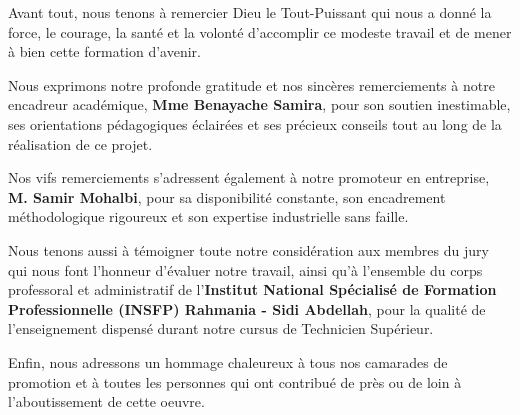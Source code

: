 \documentclass{bts-report}
\begin{document}
\maketitlepage

\frontmatter

\begin{remerciements}
Avant tout, nous tenons \`a remercier Dieu le Tout-Puissant qui nous a donn\'e la force, le courage, la sant\'e et la volont\'e d'accomplir ce modeste travail et de mener \`a bien cette formation d'avenir.

Nous exprimons notre profonde gratitude et nos sinc\`eres remerciements \`a notre encadreur acad\'emique, \textbf{Mme Benayache Samira}, pour son soutien inestimable, ses orientations p\'edagogiques \'eclair\'ees et ses pr\'ecieux conseils tout au long de la r\'ealisation de ce projet.

Nos vifs remerciements s'adressent \'egalement \`a notre promoteur en entreprise, \textbf{M. Samir Mohalbi}, pour sa disponibilit\'e constante, son encadrement m\'ethodologique rigoureux et son expertise industrielle sans faille.

Nous tenons aussi \`a t\'emoigner toute notre consid\'eration aux membres du jury qui nous font l'honneur d'\'evaluer notre travail, ainsi qu'\`a l'ensemble du corps professoral et administratif de l'\textbf{Institut National Sp\'ecialis\'e de Formation Professionnelle (INSFP) Rahmania - Sidi Abdellah}, pour la qualit\'e de l'enseignement dispens\'e durant notre cursus de Technicien Sup\'erieur.

Enfin, nous adressons un hommage chaleureux \`a tous nos camarades de promotion et \`a toutes les personnes qui ont contribu\'e de pr\`es ou de loin \`a l'aboutissement de cette oeuvre.
\end{remerciements}
\end{document}
